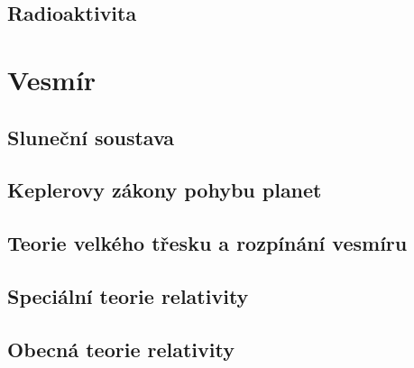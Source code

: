 \documentclass[titlepage]{book}
\begin{document}
\section{Radioaktivita}
\chapter{Vesmír}
\section{Sluneční soustava}
\section{Keplerovy zákony pohybu planet}
\section{Teorie velkého třesku a rozpínání vesmíru}
\section{Speciální teorie relativity}
\section{Obecná teorie relativity}
\end{document}
